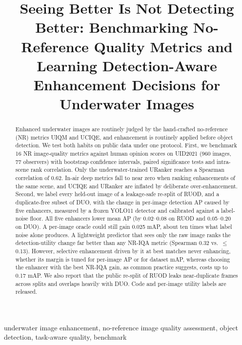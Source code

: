 \documentclass[conference]{IEEEtran}
\begin{document}
\title{Seeing Better Is Not Detecting Better: Benchmarking No-Reference Quality Metrics and Learning Detection-Aware Enhancement Decisions for Underwater Images}

\author{
}

\maketitle

\begin{abstract}
Enhanced underwater images are routinely judged by the hand-crafted no-reference (NR) metrics UIQM and UCIQE, and enhancement is routinely applied before object detection. We test both habits on public data under one protocol. First, we benchmark 16 NR image-quality metrics against human opinion scores on UID2021 (960 images, 77 observers) with bootstrap confidence intervals, paired significance tests and intra-scene rank correlation. Only the underwater-trained URanker reaches a Spearman correlation of 0.62. In-air deep metrics fall to near zero when ranking enhancements of the same scene, and UCIQE and URanker are inflated by deliberate over-enhancement. Second, we label every held-out image of a leakage-safe re-split of RUOD, and a duplicate-free subset of DUO, with the change in per-image detection AP caused by five enhancers, measured by a frozen YOLO11 detector and calibrated against a label-noise floor. All five enhancers lower mean AP (by 0.02--0.08 on RUOD and 0.05--0.20 on DUO). A per-image oracle could still gain 0.025 mAP, about ten times what label noise alone produces. A lightweight predictor that sees only the raw image ranks the detection-utility change far better than any NR-IQA metric (Spearman 0.32 vs.\ $\le$0.13). However, selective enhancement driven by it at best matches never enhancing, whether its margin is tuned for per-image AP or for dataset mAP, whereas choosing the enhancer with the best NR-IQA gain, as common practice suggests, costs up to 0.17 mAP. We also report that the public re-split of RUOD leaks near-duplicate frames across splits and overlaps heavily with DUO. Code and per-image utility labels are released.
\end{abstract}

\begin{IEEEkeywords}
underwater image enhancement, no-reference image quality assessment, object detection, task-aware quality, benchmark
\end{IEEEkeywords}
\end{document}

